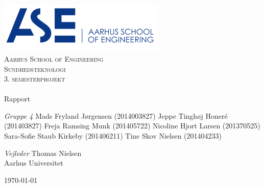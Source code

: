 \begin{titlingpage}
\begin{center}

~ \\[3cm]

\includegraphics[width=0.6\textwidth]{figurer/ASE}~\\[1cm]

\textsc{\LARGE Aarhus School of Engineering}\\[1.5cm]

\textsc{\Large Sundhedsteknologi}\\
\textsc{\Large 3. semesterprojekt}\\[0.5cm]

\noindent\makebox[\linewidth]{\rule{\textwidth}{0.4pt}}\\
[0.5cm]{\Huge Rapport}
\noindent\makebox[\linewidth]{\rule{\textwidth}{0.4pt}}

\end{center}

\textit{Gruppe 4} \newline
Mads Fryland J\o rgensen (2014003827) \newline
Jeppe Tingh\o j Honeré (201403827) \newline
Freja Ramsing Munk (201405722) \newline		 
Nicoline Hjort Larsen (201370525) \newline 
Sara-Sofie Staub Kirkeby (201406211) \newline
Tine Skov Nielsen (201404233) \newline


\textit{Vejleder} \newline
Thomas Nielsen\\
Aarhus Universitet


\vfill

\begin{center}
{\large \today}
\end{center}


\end{titlingpage}